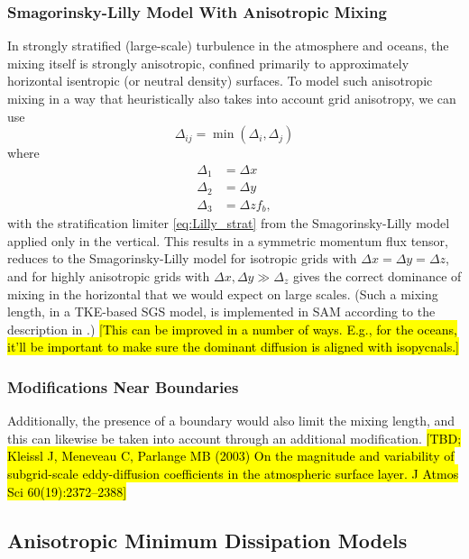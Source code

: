 \documentclass{article}
\begin{document}
\subsubsection{Smagorinsky-Lilly Model With Anisotropic Mixing}

In strongly stratified (large-scale) turbulence in the atmosphere and oceans, the mixing itself is strongly anisotropic, confined primarily to approximately horizontal isentropic (or neutral density) surfaces. To model such anisotropic mixing in a way that heuristically also takes into account grid anisotropy, we can use 
\begin{equation}
\Delta_{ij} = \min(\Delta_i, \Delta_j)  
\end{equation}
where 
\begin{align}
\Delta_1 & = \Delta x \\
\Delta_2 & = \Delta y \\
\Delta_3 & = \Delta z f_b,
\end{align}
with the stratification limiter \eqref{eq:Lilly_strat} from the Smagorinsky-Lilly model applied only in the vertical. This results in a symmetric momentum flux tensor, reduces to the Smagorinsky-Lilly model for isotropic grids with $\Delta x = \Delta y = \Delta z$, and for highly anisotropic grids with $\Delta x, \Delta y \gg \Delta_z$ gives the correct dominance of mixing in the horizontal that we would expect on large scales. (Such a mixing length, in a TKE-based SGS model, is implemented in SAM according to the description in \citet{Stevens05a}.) \hl{[This can be improved in a number of ways. E.g., for the oceans, it'll be important to make sure the dominant diffusion is aligned with isopycnals.]}

\subsubsection{Modifications Near Boundaries}
 
Additionally, the presence of a boundary would also limit the mixing length, and this can likewise be taken into account through an additional modification.  \hl{[TBD; Kleissl J, Meneveau C, Parlange MB (2003) On the magnitude and variability of subgrid-scale eddy-diffusion coefficients in the atmospheric surface layer. J Atmos Sci 60(19):2372--2388]}

\subsection{Anisotropic Minimum Dissipation Models}
\end{document}
